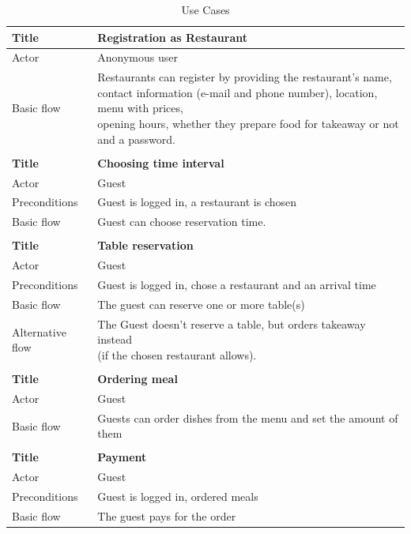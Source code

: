 \begin{table}[ht]
	\centering
	\caption{Use Cases}
	\begin{tabular}{ | l | l |}	
		\hline
		\textbf{Title} & \textbf{Registration as Restaurant} \\ \hline
		Actor &  Anonymous user \\ \hline
		Basic flow & \makecell[l]{ Restaurants can register by providing the restaurant's name, \\ contact information (e-mail and phone number), location, menu with prices, \\ opening hours, whether they prepare food for takeaway or not and a password.} \\ 
		\hline
		& \\
		\hline
		\textbf{Title} & \textbf{Choosing time interval} \\ \hline
		Actor &  Guest \\ \hline
		Preconditions &  Guest is logged in, a restaurant is chosen \\ \hline
		Basic flow & Guest can choose reservation time. \\ 
		\hline
		& \\
		\hline
		\textbf{Title} & \textbf{Table reservation} \\ \hline
		Actor &  Guest \\ \hline
		Preconditions &  Guest is logged in, chose a restaurant and an arrival time \\ \hline
		Basic flow & The guest can reserve one or more table(s) \\ \hline
		Alternative flow & \makecell[l]{ The Guest doesn't reserve a table, but orders takeaway instead \\ (if the chosen restaurant
		allows).} \\
		\hline
		& \\
		\hline
		\textbf{Title} & \textbf{Ordering meal} \\ \hline
		Actor &  Guest \\ \hline
		Basic flow & Guests can order dishes from the menu and set the amount of them \\
		\hline
		& \\
		\hline
		\textbf{Title} & \textbf{Payment} \\ \hline
		Actor &  Guest \\ \hline
		Preconditions &  Guest is logged in, ordered meals \\ \hline
		Basic flow & The guest pays for the order \\ 

\end{tabular}
\end{table}
